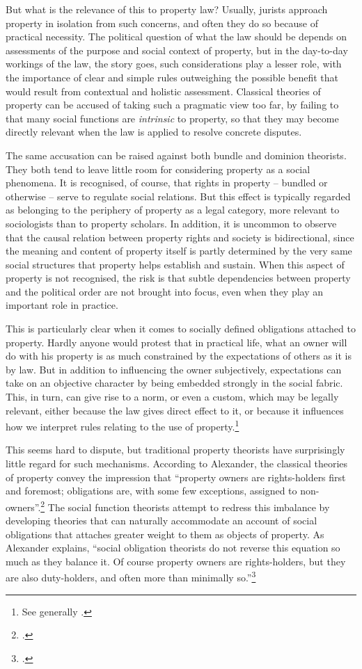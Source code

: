 But what is the relevance of this to property law? Usually, jurists approach property in isolation from such concerns, and often they do so because of practical necessity. The political question of what the law should be depends on assessments of the purpose and social context of property, but in the day-to-day workings of the law, the story goes, such considerations play a lesser role, with the importance of clear and simple rules outweighing the possible benefit that would result from contextual and holistic assessment. Classical theories of property can be accused of taking such a pragmatic view too far, by failing to  that many social functions are {\it intrinsic} to property, so that they may become directly relevant when the law is applied to resolve concrete disputes.

The same accusation can be raised against both bundle and dominion theorists. They both tend to leave little room for considering property as a social phenomena. It is recognised, of course, that rights in property -- bundled or otherwise -- serve to regulate social relations. But this effect is typically regarded as belonging to the periphery of property as a legal category, more relevant to sociologists than to property scholars. In addition, it is uncommon to observe that the causal relation between property rights and society is bidirectional, since the meaning and content of property itself is partly determined by the very same social structures that property helps establish and sustain. When this aspect of property is not recognised, the risk is that subtle dependencies between property and the political order are not brought into focus, even when they play an important role in practice.

This is particularly clear when it comes to socially defined obligations attached to property. Hardly anyone would protest that in practical life, what an owner will do with his property is as much constrained by the expectations of others as it is by law. But in addition to influencing the owner subjectively, expectations can take on an objective character by being embedded strongly in the social fabric. This, in turn, can give rise to a norm, or even a custom, which may be legally relevant, either because the law gives direct effect to it, or because it influences how we interpret rules relating to the use of property.\footnote{See generally \cite{penalver09,alexander09}.}

This seems hard to dispute, but traditional property theorists have surprisingly little regard for such mechanisms. According to Alexander, the classical theories of property convey the impression that ``property owners are rights-holders first and foremost; obligations are, with some few exceptions, assigned to non-owners''.\footcite[1023]{alexander11} The social function theorists attempt to redress this imbalance by developing theories that can naturally accommodate an account of social obligations that attaches greater weight to them as objects of property. As Alexander explains, ``social obligation theorists do not reverse this equation so much as they balance it. Of course property owners are rights-holders, but they are also duty-holders, and often more than minimally so.''\footcite[1023]{alexander11} 

